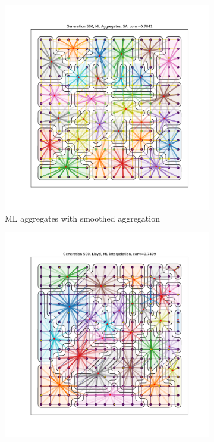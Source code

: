 \documentclass{article}
\begin{document}
\begin{figure}[h]
  \centering
  \begin{subfigure}[t]{0.49\textwidth}
    \centering
    \includegraphics[width=\textwidth]{agg.pdf}
    \caption{ML aggregates with smoothed aggregation}
  \end{subfigure}
    \begin{subfigure}[t]{0.49\textwidth}
    \centering
    \includegraphics[width=\textwidth]{interp.pdf}

\end{subfigure}
\end{figure}
\end{document}
